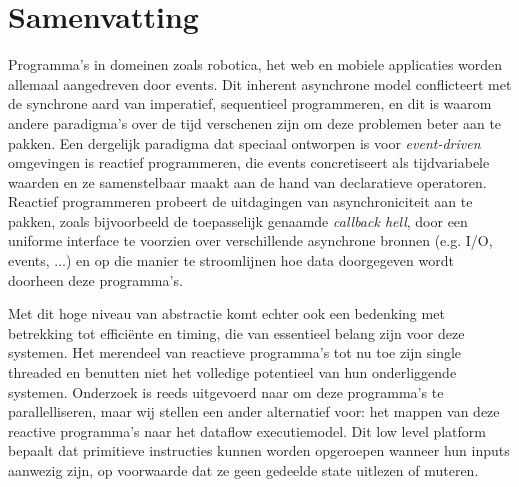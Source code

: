 \section*{Samenvatting}

Programma's in domeinen zoals robotica, het web en mobiele applicaties worden allemaal aangedreven door events. Dit inherent asynchrone model conflicteert met de synchrone aard van imperatief, sequentieel programmeren, en dit is waarom andere paradigma's over de tijd verschenen zijn om deze problemen beter aan te pakken. Een dergelijk paradigma dat speciaal ontworpen is voor \textit{event-driven} omgevingen is reactief programmeren, die events concretiseert als tijdvariabele waarden en ze samenstelbaar maakt aan de hand van declaratieve operatoren. Reactief programmeren probeert de uitdagingen van asynchroniciteit aan te pakken, zoals bijvoorbeeld de toepasselijk genaamde \textit{callback hell}, door een uniforme interface te voorzien over verschillende asynchrone bronnen (e.g. I/O, events, ...) en op die manier te stroomlijnen hoe data doorgegeven wordt doorheen deze programma's.

Met dit hoge niveau van abstractie komt echter ook een bedenking met betrekking tot efficiënte en timing, die van essentieel belang zijn voor deze systemen. Het merendeel van reactieve programma's tot nu toe zijn single threaded en benutten niet het volledige potentieel van hun onderliggende systemen. Onderzoek is reeds uitgevoerd naar om deze programma's te parallelliseren, maar wij stellen een ander alternatief voor: het mappen van deze reactive programma's naar het dataflow executiemodel. Dit low level platform bepaalt dat primitieve instructies kunnen worden opgeroepen wanneer hun inputs aanwezig zijn, op voorwaarde dat ze geen gedeelde state uitlezen of muteren. 